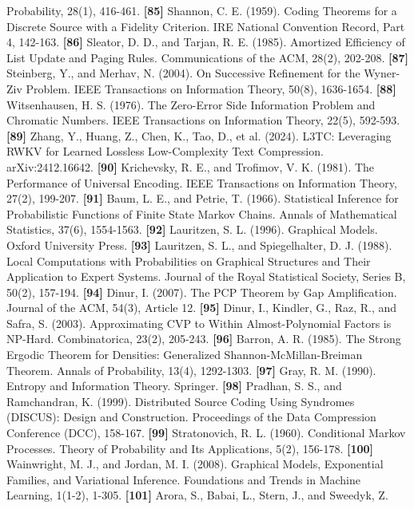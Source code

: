 \documentclass[
]{article}
\begin{document}
Probability, 28(1), 416-461.
\textbf{{[}85{]}} Shannon, C. E. (1959). Coding Theorems for a Discrete
Source with a Fidelity Criterion. IRE National Convention Record, Part 4,
142-163.
\textbf{{[}86{]}} Sleator, D. D., and Tarjan, R. E. (1985). Amortized
Efficiency of List Update and Paging Rules. Communications of the ACM,
28(2), 202-208.
\textbf{{[}87{]}} Steinberg, Y., and Merhav, N. (2004). On Successive
Refinement for the Wyner-Ziv Problem. IEEE Transactions on Information
Theory, 50(8), 1636-1654.
\textbf{{[}88{]}} Witsenhausen, H. S. (1976). The Zero-Error Side
Information Problem and Chromatic Numbers. IEEE Transactions on
Information Theory, 22(5), 592-593.
\textbf{{[}89{]}} Zhang, Y., Huang, Z., Chen, K., Tao, D., et al.
(2024). L3TC: Leveraging RWKV for Learned Lossless Low-Complexity Text
Compression. arXiv:2412.16642.
\textbf{{[}90{]}} Krichevsky, R. E., and Trofimov, V. K. (1981). The
Performance of Universal Encoding. IEEE Transactions on Information
Theory, 27(2), 199-207.
\textbf{{[}91{]}} Baum, L. E., and Petrie, T. (1966). Statistical
Inference for Probabilistic Functions of Finite State Markov Chains.
Annals of Mathematical Statistics, 37(6), 1554-1563.
\textbf{{[}92{]}} Lauritzen, S. L. (1996). Graphical Models. Oxford
University Press.
\textbf{{[}93{]}} Lauritzen, S. L., and Spiegelhalter, D. J. (1988).
Local Computations with Probabilities on Graphical Structures and
Their Application to Expert Systems. Journal of the Royal Statistical
Society, Series B, 50(2), 157-194.
\textbf{{[}94{]}} Dinur, I. (2007). The PCP Theorem by Gap
Amplification. Journal of the ACM, 54(3), Article 12.
\textbf{{[}95{]}} Dinur, I., Kindler, G., Raz, R., and Safra, S.
(2003). Approximating CVP to Within Almost-Polynomial Factors is
NP-Hard. Combinatorica, 23(2), 205-243.
\textbf{{[}96{]}} Barron, A. R. (1985). The Strong Ergodic Theorem
for Densities: Generalized Shannon-McMillan-Breiman Theorem. Annals
of Probability, 13(4), 1292-1303.
\textbf{{[}97{]}} Gray, R. M. (1990). Entropy and Information
Theory. Springer.
\textbf{{[}98{]}} Pradhan, S. S., and Ramchandran, K. (1999).
Distributed Source Coding Using Syndromes (DISCUS): Design and
Construction. Proceedings of the Data Compression Conference (DCC),
158-167.
\textbf{{[}99{]}} Stratonovich, R. L. (1960). Conditional Markov
Processes. Theory of Probability and Its Applications, 5(2), 156-178.
\textbf{{[}100{]}} Wainwright, M. J., and Jordan, M. I. (2008).
Graphical Models, Exponential Families, and Variational Inference.
Foundations and Trends in Machine Learning, 1(1-2), 1-305.
\textbf{{[}101{]}} Arora, S., Babai, L., Stern, J., and Sweedyk, Z.
\end{document}
